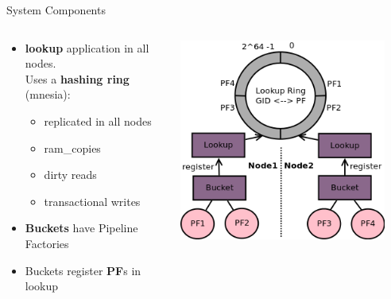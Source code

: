 \documentclass[aspectratio=43]{beamer}
\begin{document}
\begin{frame}{System Components}
    \begin{columns}
        \begin{column}[c]{0.5\textwidth}
            \begin{itemize}
                \item \textbf{lookup} application in all nodes.\\
                      Uses a \textbf{hashing ring} (mnesia):
                            \begin{itemize}
                                \item replicated in all nodes
                                \item ram\_copies
                                \item dirty reads
                                \item transactional writes
                            \end{itemize}
                \item \textbf{Buckets} have Pipeline Factories
                \item Buckets register \textbf{PF}s in lookup
            \end{itemize}
        \end{column}
        \begin{column}[c]{0.5\textwidth}
            \includegraphics[width=0.9\textwidth]{images/components.png}
        \end{column}
    \end{columns}
\end{frame}
\end{document}
